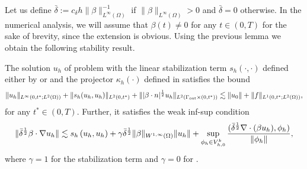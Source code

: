 Let us define $\bar{\delta} := c_{\delta} {h}{\| \beta \|_{L^\infty(\Omega)}^{-1}}$ if $\| \beta \|_{L^\infty(\Omega)}>0$ and $\bar{\delta} = 0$ otherwise. In the numerical analysis, we will assume that $\beta(t) \not = 0$ for any $t \in (0,T)$ for the sake of brevity, since the extension is obvious. Using the previous lemma we obtain the following stability result.
\begin{theorem}[Stability]
The solution $u_h$ of problem  with the linear stabilization term $s_h(\cdot,\cdot)$ defined either by  or  and the projector $\kappa_h(\cdot)$ defined in  
satisfies the bound
$$
\| u_h\|_{L^\infty(0,t^*;L^2(\Omega))} + \|s_h(u_h,u_h)\|_{L^2(0,t^*)} + \| |\beta \cdot n|^{\frac{1}{2}} u_h\|_{L^2( \Gamma_{\rm out} \times (0,t^*))} \lesssim \|u_0\| + \|f\|_{L^1(0,t^*;L^2(\Omega))},
$$
for any $t^* \in (0,T)$. Further, it satisfies the weak inf-sup condition
\begin{align}\label{eq-dinfsup}
\| \bar{\delta}^{\frac{1}{2}} \beta \cdot \nabla u_h \| \lesssim   s_h\left(u_h,u_h\right)  +
\gamma \bar\delta^{\frac{1}{2}} \|\beta\|_{W^{1,\infty}(\Omega)}  \|u_h\| + \sup_{\phi_h \in V^k_{h,0}} \frac{(\bar\delta^{\frac{1}{2}} \nabla \cdot (\beta u_h),\phi_h)}{\|\phi_h\|},
\end{align}
where $\gamma = 1$ for the stabilization term  and $\gamma = 0$ for .
\end{theorem}

